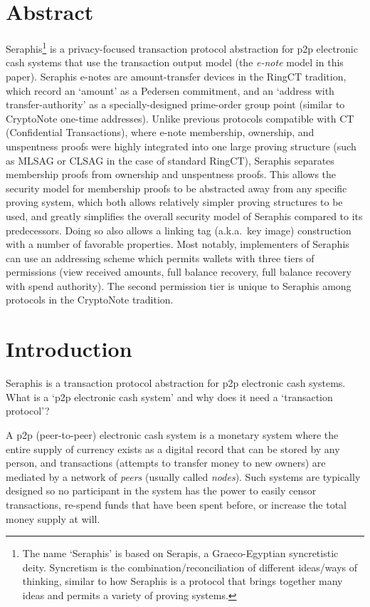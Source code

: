 \section{Abstract}
\label{sec:abstract}

Seraphis\footnote{The name `Seraphis' is based on Serapis, a Graeco-Egyptian syncretistic deity. Syncretism is the combination/reconciliation of different ideas/ways of thinking, similar to how Seraphis is a protocol that brings together many ideas and permits a variety of proving systems.} is a privacy-focused transaction protocol abstraction for p2p electronic cash systems that use the transaction output model (the {\em e-note} model in this paper). Seraphis e-notes are amount-transfer devices in the RingCT tradition, which record an `amount' as a Pedersen commitment, and an `address with transfer-authority' as a specially-designed prime-order group point (similar to CryptoNote one-time addresses). Unlike previous protocols compatible with CT (Confidential Transactions), where e-note membership, ownership, and unspentness proofs were highly integrated into one large proving structure (such as MLSAG or CLSAG in the case of standard RingCT), Seraphis separates membership proofs from ownership and unspentness proofs. This allows the security model for membership proofs to be abstracted away from any specific proving system, which both allows relatively simpler proving structures to be used, and greatly simplifies the overall security model of Seraphis compared to its predecessors. Doing so also allows a linking tag (a.k.a.\ key image) construction with a number of favorable properties. Most notably, implementers of Seraphis can use an addressing scheme which permits wallets with three tiers of permissions (view received amounts, full balance recovery, full balance recovery with spend authority). The second permission tier is unique to Seraphis among protocols in the CryptoNote tradition.



\section{Introduction}
\label{sec:introduction}

Seraphis is a transaction protocol abstraction for p2p electronic cash systems. What is a `p2p electronic cash system' and why does it need a `transaction protocol'?

A p2p (peer-to-peer) electronic cash system is a monetary system where the entire supply of currency exists as a digital record that can be stored by any person, and transactions (attempts to transfer money to new owners) are mediated by a network of {\em peers} (usually called {\em nodes}). Such systems are typically designed so no participant in the system has the power to easily censor transactions, re-spend funds that have been spent before, or increase the total money supply at will.

